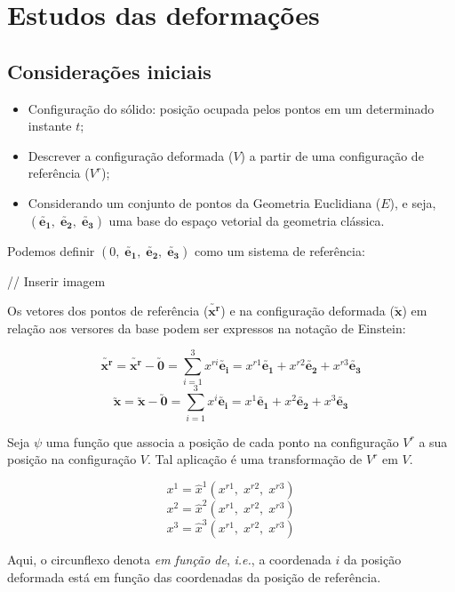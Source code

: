 \section{Estudos das deformações}
	
	\subsection{Considerações iniciais}
	
	
	\begin{itemize}
		\item Configuração do sólido: posição ocupada pelos pontos em um determinado instante $t$;
		\item Descrever a configuração deformada ($V$) a partir de uma configuração de referência ($V^r$);
		\item Considerando um conjunto de pontos da Geometria Euclidiana ($E$), e seja, $(\utilde{\mathbf{e_1}},\;\utilde{\mathbf{e_2}},\;\utilde{\mathbf{e_3}})$ uma base do espaço vetorial da geometria clássica.
	\end{itemize}
	
	Podemos definir $(0,\;\utilde{\mathbf{e_1}},\;\utilde{\mathbf{e_2}},\;\utilde{\mathbf{e_3}})$ como um sistema de referência:
	
	// Inserir imagem
	
	Os vetores dos pontos de referência ($\utilde{\mathbf{x^r}}$) e na configuração deformada ($\utilde{\mathbf{x}}$) em relação aos versores da base podem ser expressos na notação de Einstein:
	
	\[\utilde{\mathbf{x^r}}=\utilde{\mathbf{x^r}}-\utilde{\mathbf{0}}=\sum_{i=1}^3x^{ri}\utilde{\mathbf{e_i}}=x^{r1}\utilde{\mathbf{e_1}}+x^{r2}\utilde{\mathbf{e_2}}+x^{r3}\utilde{\mathbf{e_3}}\]
	\[\utilde{\mathbf{x}}=\utilde{\mathbf{x}}-\utilde{\mathbf{0}}=\sum_{i=1}^3x^i\utilde{\mathbf{e_i}}=x^1\utilde{\mathbf{e_1}}+x^2\utilde{\mathbf{e_2}}+x^3\utilde{\mathbf{e_3}}\]
	
	Seja $\psi$ uma função que associa a posição de cada ponto na configuração $V^r$ a sua posição na configuração $V$. Tal aplicação é uma transformação de $V^r$ em $V$.
	
	\[x^1=\hat{x}^1(x^{r1},\;x^{r2},\;x^{r3})\]
	\[x^2=\hat{x}^2(x^{r1},\;x^{r2},\;x^{r3})\]
	\[x^3=\hat{x}^3(x^{r1},\;x^{r2},\;x^{r3})\]
	
	Aqui, o circunflexo denota \textit{em função de}, \textit{i.e.}, a coordenada $i$ da posição deformada está em função das coordenadas da posição de referência.
	
